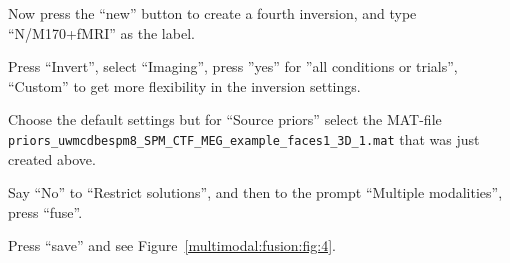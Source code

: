 Now press the ``new'' button to create a fourth inversion, and type ``N/M170+fMRI'' as the label.

Press ``Invert'', select ``Imaging'', press ''yes'' for ''all conditions or trials'', ``Custom'' to get more flexibility in the inversion settings.

Choose the default settings but for ``Source priors'' select the MAT-file \texttt{priors\_\-uwmcdbespm8\_\-SPM\_\-CTF\_\-MEG\_\-example\_\-faces1\_\-3D\_\-1.mat} that was just created above. 

Say ``No'' to ``Restrict solutions'', and then to the prompt ``Multiple modalities'', press ``fuse''.


Press ``save'' and see Figure~\ref{multimodal:fusion:fig:4}.


